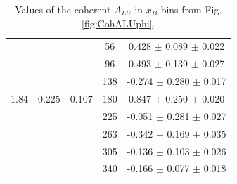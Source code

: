 \documentclass{article}
\begin{document}
\begin{table}[!h]
\begin{center}
\begin{tabular}{|c|c|c|c|c|}
        &       &       &  56   &  0.428  $\pm$ 0.089  $\pm$ 0.022  \\
        &       &       &  96   &  0.493  $\pm$ 0.139  $\pm$ 0.027  \\
        &       &       & 138   & -0.274  $\pm$ 0.280  $\pm$ 0.017  \\
  1.84  & 0.225 & 0.107 & 180   &  0.847  $\pm$ 0.250  $\pm$ 0.020  \\
        &       &       & 225   & -0.051  $\pm$ 0.281  $\pm$ 0.027  \\
        &       &       & 263   & -0.342  $\pm$ 0.169  $\pm$ 0.035  \\
        &       &       & 305   & -0.136  $\pm$ 0.103  $\pm$ 0.026  \\
        &       &       & 340   & -0.166  $\pm$ 0.077  $\pm$ 0.018  \\
         \hline
      \end{tabular}
      \caption{Values of the coherent $A_{LU}$ in $x_B$ bins from Fig. \ref{fig:CohALUphi}.}
      \label{table:Coh_xB_BSA}
   \end{center}
\end{table}                        
\end{document}
